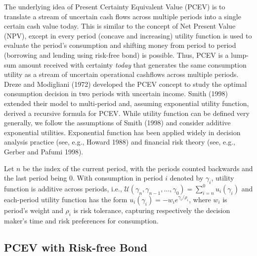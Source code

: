 \documentclass[mnsc,nonblindrev,copyedit]{informs2_wz} %
\begin{document}
The underlying idea of Present Certainty Equivalent Value (PCEV) is to translate a stream of uncertain cash flows across multiple periods into a single certain cash value today.  This is similar to the concept of Net Present Value (NPV), except in every period (concave and increasing) utility function is used to evaluate the period's consumption and  shifting money from period to period (borrowing and lending using risk-free bond) is possible.
Thus, PCEV is a lump-sum amount received with certainty {\em today} that generates the same consumption utility as a stream of uncertain operational cashflows across multiple periods. Dreze and Modigliani (1972) developed the PCEV concept to study the optimal consumption decision in two periods with uncertain income. Smith (1998) extended their model to multi-period and, assuming exponential utility function, derived a recursive formula for PCEV. %
While utility function can be defined very generally, we follow the assumptions of Smith (1998) and consider additive exponential utilities.  Exponential function has been applied widely in decision analysis practice (see, e.g., Howard 1988) and financial risk theory (see, e.g., Gerber and Pafumi 1998). 


Let $n$ be the index of the current period, with the periods counted backwards and the last period being 0.  With consumption in period $i$ denoted by $\gamma_i$, utility function is additive across periods, i.e., 
$\mathcal{U}(\gamma_n, \gamma_{n-1}, \ldots, \gamma_0) = \sum_{i=n}^0 u_i(\gamma_i)$
and each-period utility function has the form $u_i(\gamma_i) = -w_i e^{\gamma_i/\rho_i}$, where $w_i$ is period's weight and $\rho_i$ is risk tolerance, capturing respectively the decision maker's time and risk preferences for consumption.





\subsection{PCEV with Risk-free Bond}
\end{document}
